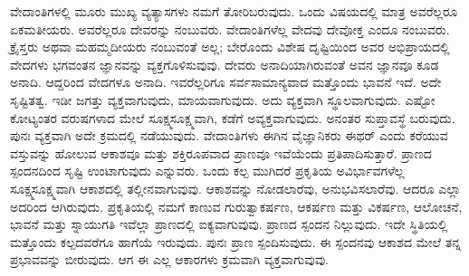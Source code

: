 ವೇದಾಂತಿಗಳಲ್ಲಿ ಮೂರು ಮುಖ್ಯ ವ್ಯತ್ಯಾಸಗಳು ನಮಗೆ ತೋರಿಬರುವುದು. ಒಂದು ವಿಷಯದಲ್ಲಿ ಮಾತ್ರ ಅವರೆಲ್ಲರೂ ಏಕಮತೀಯರು. ಅವರೆಲ್ಲರೂ ದೇವರನ್ನು ನಂಬುವರು. ವೇದಾಂತಿಗಳೆಲ್ಲ ವೇದವು ದೇವೋಕ್ತ ಎಂದೂ ನಂಬುವರು. ಕ್ರೈಸ್ತರು ಅಥವಾ ಮಹಮ್ಮದೀಯರು ನಂಬುವಂತೆ ಅಲ್ಲ; ಬೇರೊಂದು ವಿಶೇಷ ದೃಷ್ಟಿಯಿಂದ ಅವರ ಅಭಿಪ್ರಾಯದಲ್ಲಿ ವೇದಗಳು ಭಗವಂತನ ಜ್ಞಾನವನ್ನು ವ್ಯಕ್ತಗೊಳಿಸುವುವು. ದೇವರು ಅನಾದಿಯಾಗಿರುವಂತೆ ಅವನ ಜ್ಞಾನವೂ ಕೂಡ ಅನಾದಿ. ಆದ್ದರಿಂದ ವೇದಗಳೂ ಅನಾದಿ. ಇವರೆಲ್ಲರಿಗೂ ಸರ್ವಸಾಮಾನ್ಯವಾದ ಮತ್ತೊಂದು ಭಾವನೆ ಇದೆ. ಅದೇ ಸೃಷ್ಟಿತತ್ವ. ಇಡೀ ಜಗತ್ತು ವ್ಯಕ್ತವಾಗುವುದು, ಮಾಯವಾಗುವುದು. ಅದು ವ್ಯಕ್ತವಾಗಿ ಸ್ಥೂಲವಾಗುವುದು. ಎಷ್ಟೋ ಕೋಟ್ಯಂತರ ವರುಷಗಳಾದ ಮೇಲೆ ಸೂಕ್ಷ್ಮಸೂಕ್ಷ್ಮವಾಗಿ, ಕಡೆಗೆ ಅವ್ಯಕ್ತವಾಗುವುದು. ಅನಂತರ ಸುಪ್ತಾವಸ್ಥೆ ಬರುವುದು. ಪುನಃ ವ್ಯಕ್ತವಾಗಿ ಅದೇ ಕ್ರಮದಲ್ಲಿ ನಡೆಯುವುದು. ವೇದಾಂತಿಗಳು ಈಗಿನ ವೈಜ್ಞಾನಿಕರು ಈಥರ್​ ಎಂದು ಕರೆಯುವ ವಸ್ತುವನ್ನು ಹೋಲುವ ಆಕಾಶವೂ ಮತ್ತು ಶಕ್ತಿರೂಪವಾದ ಪ್ರಾಣವೂ ಇವೆಯೆಂದು ಪ್ರತಿಪಾದಿಸುತ್ತಾರೆ. ಪ್ರಾಣದ ಸ್ಪಂದನದಿಂದ ಸೃಷ್ಟಿ ಉಂಟಾಗುವುದು ಎನ್ನುವರು. ಒಂದು ಕಲ್ಪ ಮುಗಿದರೆ ಪ್ರಕೃತಿಯ ಅವಿರ್ಭಾವಗಳೆಲ್ಲ ಸೂಕ್ಷ್ಮಸೂಕ್ಷ್ಮವಾಗಿ ಆಕಾಶದಲ್ಲಿ ತಲ್ಲೀನವಾಗುವುವು. ಆಕಾಶವನ್ನು ನೋಡಲಾರೆವು, ಅನುಭವಿಸಲಾರೆವು. ಆದರೂ ಎಲ್ಲಾ ಅದರಿಂದ ಆಗಿರುವುದು. ಪ್ರಕೃತಿಯಲ್ಲಿ ನಮಗೆ ಕಾಣುವ ಗುರುತ್ವಾಕರ್ಷಣ, ಆಕರ್ಷಣ ಮತ್ತು ವಿಕರ್ಷಣ, ಆಲೋಚನೆ, ಭಾವನೆ ಮತ್ತು ಸ್ನಾಯುಗತಿ ಇವೆಲ್ಲಾ ಪ್ರಾಣದಲ್ಲಿ ಐಕ್ಯವಾಗುವುವು. ಪ್ರಾಣದ ಸ್ಪಂದನ ನಿಲ್ಲುವುದು. ಇದೇ ಸ್ಥಿತಿಯಲ್ಲಿ ಮತ್ತೊಂದು ಕಲ್ಪದವರೆಗೂ ಹಾಗೆಯೆ ಇರುವುದು. ಪುನಃ ಪ್ರಾಣ ಸ್ಪಂದಿಸುವುದು. ಈ ಸ್ಪಂದನವು ಆಕಾಶದ ಮೇಲೆ ತನ್ನ ಪ್ರಭಾವವನ್ನು ಬೀರುವುದು. ಆಗ ಈ ಎಲ್ಲ ಆಕಾರಗಳು ಕ್ರಮವಾಗಿ ವ್ಯಕ್ತವಾಗುವುವು.



